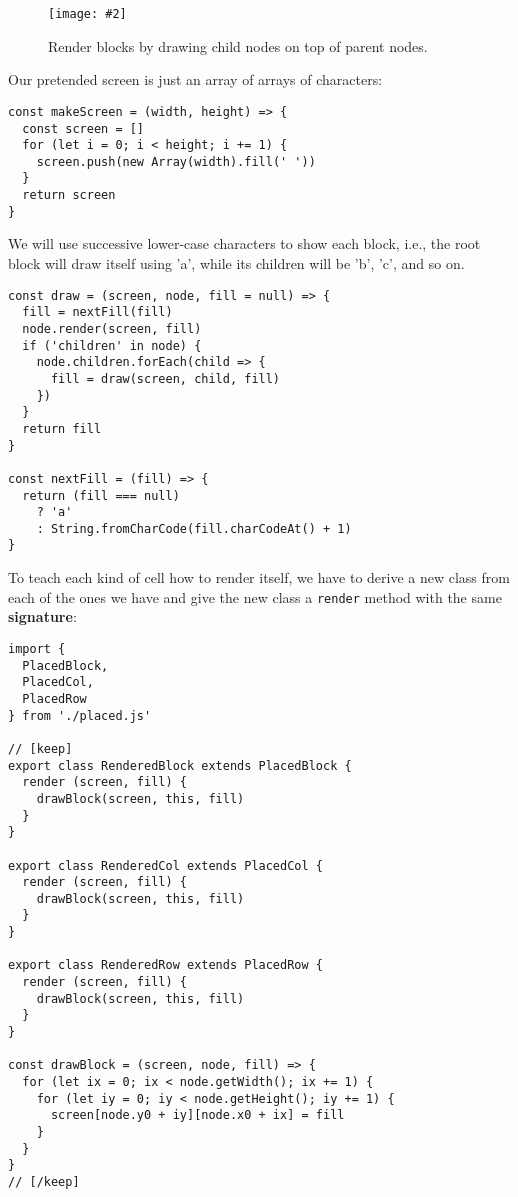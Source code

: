 \documentclass[krantzl]{krantz}
\newcommand{\figpdf}[4]{\begin{figure}%
\centering%
\texttt{[image: \#2]}%
\caption{#3}%
\label{#1}%
\end{figure}}
\newcommand{\glossref}[1]{\textbf{#1}}
\begin{document}
\figpdf{layout-engine-draw-over}{./layout-engine/draw-over.pdf}{Render blocks by drawing child nodes on top of parent nodes.}{0.6}


Our pretended screen is just an array of arrays of characters:


\begin{lstlisting}[frame=single,frameround=tttt]
const makeScreen = (width, height) => {
  const screen = []
  for (let i = 0; i < height; i += 1) {
    screen.push(new Array(width).fill(' '))
  }
  return screen
}
\end{lstlisting}



We will use successive lower-case characters to show each block,
i.e.,
the root block will draw itself using 'a',
while its children will be 'b', 'c', and so on.


\begin{lstlisting}[frame=single,frameround=tttt]
const draw = (screen, node, fill = null) => {
  fill = nextFill(fill)
  node.render(screen, fill)
  if ('children' in node) {
    node.children.forEach(child => {
      fill = draw(screen, child, fill)
    })
  }
  return fill
}

const nextFill = (fill) => {
  return (fill === null)
    ? 'a'
    : String.fromCharCode(fill.charCodeAt() + 1)
}
\end{lstlisting}



To teach each kind of cell how to render itself,
we have to derive a new class from each of the ones we have
and give the new class a \texttt{render} method with the same \glossref{signature}:


\begin{lstlisting}[frame=single,frameround=tttt]
import {
  PlacedBlock,
  PlacedCol,
  PlacedRow
} from './placed.js'

// [keep]
export class RenderedBlock extends PlacedBlock {
  render (screen, fill) {
    drawBlock(screen, this, fill)
  }
}

export class RenderedCol extends PlacedCol {
  render (screen, fill) {
    drawBlock(screen, this, fill)
  }
}

export class RenderedRow extends PlacedRow {
  render (screen, fill) {
    drawBlock(screen, this, fill)
  }
}

const drawBlock = (screen, node, fill) => {
  for (let ix = 0; ix < node.getWidth(); ix += 1) {
    for (let iy = 0; iy < node.getHeight(); iy += 1) {
      screen[node.y0 + iy][node.x0 + ix] = fill
    }
  }
}
// [/keep]
\end{lstlisting}
\end{document}

